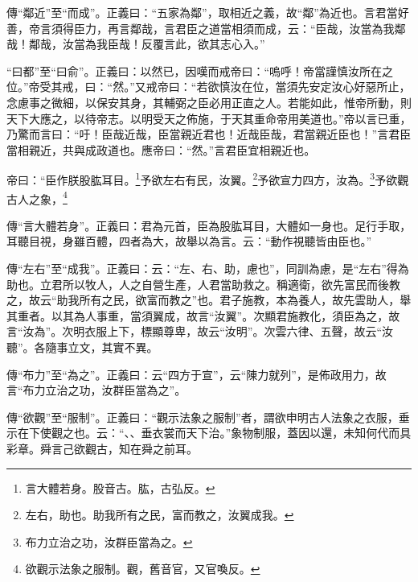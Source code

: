{\noindent\zhuan{}\fzbyks 傳“鄰近”至“而成”。正義曰：“五家為鄰”，取相近之義，故“鄰”為近也。言君當好善，帝言須得臣力，再言鄰哉，言君臣之道當相須而成，云：“臣哉，汝當為我鄰哉！鄰哉，汝當為我臣哉！反覆言此，欲其志心入。” \par}

{\noindent\shu{}\fzkt “曰都”至“曰俞”。正義曰：以然已，因嘆而戒帝曰：“嗚呼！帝當謹慎汝所在之位。”帝受其戒，曰：“然。”又戒帝曰：“若欲慎汝在位，當須先安定汝心好惡所止，念慮事之微細，以保安其身，其輔弼之臣必用正直之人。若能如此，惟帝所動，則天下大應之，以待帝志。以明受天之佈施，于天其重命帝用美道也。”帝以言已重，乃驚而言曰：“吁！臣哉近哉，臣當親近君也！近哉臣哉，君當親近臣也！”言君臣當相親近，共與成政道也。應帝曰：“然。”言君臣宜相親近也。 \par}

帝曰：“臣作朕股肱耳目。\footnote{言大體若身。股音古。肱，古弘反。}予欲左右有民，汝翼。\footnote{左右，助也。助我所有之民，富而教之，汝翼成我。}予欲宣力四方，汝為。\footnote{布力立治之功，汝群臣當為之。}予欲觀古人之象，\footnote{欲觀示法象之服制。觀，舊音官，又官喚反。}


{\noindent\zhuan{}\fzbyks 傳“言大體若身”。正義曰：君為元首，臣為股肱耳目，大體如一身也。足行手取，耳聽目視，身雖百體，四者為大，故舉以為言。云：“動作視聽皆由臣也。” \par}

{\noindent\zhuan{}\fzbyks 傳“左右”至“成我”。正義曰：云：“左、右、助，慮也”，同訓為慮，是“左右”得為助也。立君所以牧人，人之自營生產，人君當助救之。稱適衛，欲先富民而後教之，故云“助我所有之民，欲富而教之”也。君子施教，本為養人，故先雲助人，舉其重者。以其為人事重，當須翼成，故言“汝翼”。次顯君施教化，須臣為之，故言“汝為”。次明衣服上下，標顯尊卑，故云“汝明”。次雲六律、五聲，故云“汝聽”。各隨事立文，其實不異。 \par}

{\noindent\zhuan{}\fzbyks 傳“布力”至“為之”。正義曰：云“四方于宣”，云“陳力就列”，是佈政用力，故言“布力立治之功，汝群臣當為之”。 \par}

{\noindent\zhuan{}\fzbyks 傳“欲觀”至“服制”。正義曰：“觀示法象之服制”者，謂欲申明古人法象之衣服，垂示在下使觀之也。云：“、、垂衣裳而天下治。”象物制服，蓋因以還，未知何代而具彩章。舜言己欲觀古，知在舜之前耳。 \par}

